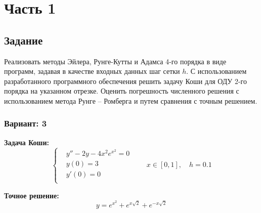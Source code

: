
\chapter*{Часть 1}

\section*{Задание}
Реализовать методы Эйлера, Рунге-Кутты и Адамса 4-го порядка в виде
программ, задавая в качестве входных данных шаг сетки $h$. С использованием
разработанного программного обеспечения решить задачу Коши для ОДУ 2-го
порядка на указанном отрезке. Оценить погрешность численного решения с
использованием метода Рунге – Ромберга и путем сравнения с точным решением.

\subsection*{Вариант: 3}

\textbf{Задача Коши:}
\begin{equation*}\left\{\begin{aligned}
    & y'' - 2y - 4x^2e^{x^2} = 0 \\
    & y(0) = 3 \\
    & y'(0) = 0 \\
\end{aligned}\right. \qquad x \in [0,1],\quad h=0.1
\end{equation*}

\textbf{Точное решение:}
\begin{equation*}
    y = e^{x^2} + e^{x \sqrt{2}} + e^{-x \sqrt{2}}
\end{equation*}

\pagebreak